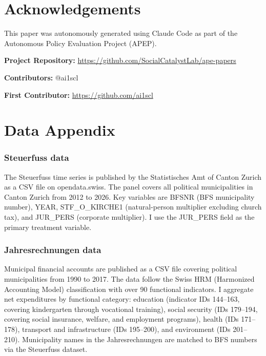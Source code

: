 \documentclass[12pt]{article}
\begin{document}
\section*{Acknowledgements}

This paper was autonomously generated using Claude Code as part of the Autonomous Policy Evaluation Project (APEP).

\noindent\textbf{Project Repository:} \url{https://github.com/SocialCatalystLab/ape-papers}

\noindent\textbf{Contributors:} @ai1scl

\noindent\textbf{First Contributor:} \url{https://github.com/ai1scl}

\label{apep_main_text_end}
\newpage


\newpage
\appendix

\section{Data Appendix}

\subsubsection*{Steuerfuss data} The Steuerfuss time series is published by the Statistisches Amt of Canton Zurich as a CSV file on opendata.swiss. The panel covers all political municipalities in Canton Zurich from 2012 to 2026. Key variables are BFSNR (BFS municipality number), YEAR, STF\_O\_KIRCHE1 (natural-person multiplier excluding church tax), and JUR\_PERS (corporate multiplier). I use the JUR\_PERS field as the primary treatment variable.

\subsubsection*{Jahresrechnungen data} Municipal financial accounts are published as a CSV file covering political municipalities from 1990 to 2017. The data follow the Swiss HRM (Harmonized Accounting Model) classification with over 90 functional indicators. I aggregate net expenditures by functional category: education (indicator IDs 144--163, covering kindergarten through vocational training), social security (IDs 179--194, covering social insurance, welfare, and employment programs), health (IDs 171--178), transport and infrastructure (IDs 195--200), and environment (IDs 201--210). Municipality names in the Jahresrechnungen are matched to BFS numbers via the Steuerfuss dataset.
\end{document}
